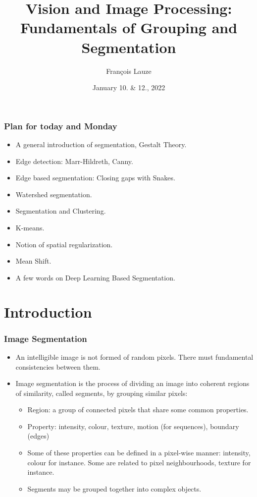 \documentclass[9pt]{beamer}
\title{Vision and Image Processing:\\ Fundamentals of Grouping and Segmentation}
\author[F.~Lauze] %
{Fran{\c c}ois Lauze}
\institute[DIKU] %
{
  Department of Computer Science\\
  University of Copenhagen
}
\date[2021-2022 B2]{January 10. \& 12., 2022} %
\begin{document}
\maketitle








\begin{frame}
  \frametitle{Plan for today and Monday}
  \begin{itemize}
  \item A general introduction of segmentation, Gestalt Theory.
  \item Edge detection: Marr-Hildreth, Canny.
  \item Edge based segmentation: Closing gaps with Snakes.
  \item Watershed segmentation.
  \item Segmentation and Clustering.
  \item K-means.
  \item Notion of spatial regularization.
  \item Mean Shift.
  \item A few words on Deep Learning Based Segmentation.
  \end{itemize}
\end{frame}

\section{Introduction}

\begin{frame}
  \frametitle{Image Segmentation}
  \begin{itemize}
  \item An intelligible image is not formed of random pixels. There must fundamental consistencies between them.\vfill
  \item Image segmentation is the process of dividing an image into
    coherent regions of similarity, called segments, by grouping similar pixels:\vfill
    \begin{itemize}
    \item Region:  a group of connected pixels that share some common properties.\vfill
    \item Property: intensity, colour, texture, motion (for sequences), boundary (edges)\vfill
    \item Some of these properties can be defined in a pixel-wise manner: intensity, colour for instance. 
      Some are related to pixel neighbourhoods, texture for instance.\vfill
    \item Segments may be grouped together into complex objects.
    \end{itemize}
 \end{itemize}
\end{frame}
\end{document}
